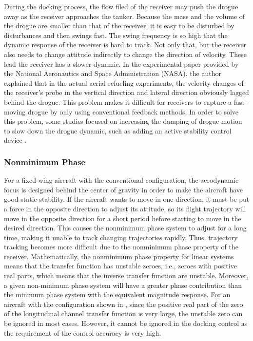During the docking process, the flow filed of the receiver may push
the drogue away as the receiver approaches the tanker. Because the
mass and the volume of the drogue are smaller than that of the receiver,
it is easy to be disturbed by disturbances and then swings fast. The
swing frequency is so high that the dynamic response of the receiver
is hard to track. Not only that, but the receiver also needs to change
attitude indirectly to change the direction of velocity. These lead
the receiver has a slower dynamic. In the experimental paper \cite{Dibley-2007-2}
provided by the National Aeronautics and Space Administration (NASA),
the author explained that in the actual aerial refueling experiments,
the velocity changes of the receiver\textquoteright s probe in the
vertical direction and lateral direction obviously lagged behind the
drogue. This problem makes it difficult for receivers to capture a
fast-moving drogue by only using conventional feedback methods. In
order to solve this problem, some studies focused on increasing the
damping of drogue motion to slow down the drogue dynamic, such as
adding an active stability control device \cite{Ro-2010-5}.

\subsubsection{Nonminimum Phase \cite{hoagg2007nonminimum}}

For a fixed-wing aircraft with the conventional configuration, the
aerodynamic focus is designed behind the center of gravity in order
to make the aircraft have good static stability. If the aircraft wants
to move in one direction, it must be put a force in the opposite direction
to adjust its attitude, so its flight trajectory will move in the
opposite direction for a short period before starting to move in the
desired direction. This causes the nonminimum phase system to adjust
for a long time, making it unable to track changing trajectories rapidly.
Thus, trajectory tracking becomes more difficult due to the nonminimum
phase property of the receiver. Mathematically, the nonminimum phase
property for linear systems means that the transfer function has unstable
zeroes, i.e., zeroes with positive real parts, which means that the
inverse transfer function are unstable. Moreover, a given non-minimum
phase system will have a greater phase contribution than the minimum
phase system with the equivalent magnitude response. For an aircraft
with the configuration shown in \cite{benvenuti1994approximate},
since the positive real part of the zero of the longitudinal channel
transfer function is very large, the unstable zero can be ignored
in most cases. However, it cannot be ignored in the docking control
as the requirement of the control accuracy is very high. 

